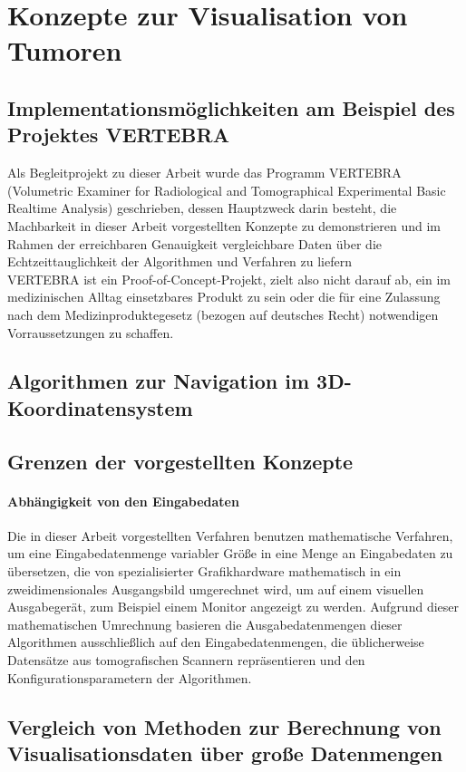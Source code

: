 \documentclass[a4paper]{scrartcl}
\begin{document}
\section{Konzepte zur Visualisation von Tumoren}\label{ssec:concepts}
\subsection{Implementationsmöglichkeiten am Beispiel des Projektes VERTEBRA}\label{ssec:implementations}
Als Begleitprojekt zu dieser Arbeit wurde das Programm VERTEBRA
(Volumetric Examiner for Radiological and Tomographical Experimental Basic Realtime Analysis) geschrieben, dessen Hauptzweck darin besteht, die Machbarkeit in dieser Arbeit vorgestellten Konzepte zu demonstrieren und im Rahmen der erreichbaren Genauigkeit vergleichbare Daten über die Echtzeittauglichkeit der Algorithmen und Verfahren zu liefern \\
VERTEBRA ist ein Proof-of-Concept-Projekt, zielt also nicht darauf ab, ein im medizinischen Alltag einsetzbares Produkt zu sein oder die für eine Zulassung nach dem Medizinproduktegesetz (bezogen auf deutsches Recht) notwendigen Vorraussetzungen zu schaffen.
\subsection{Algorithmen zur Navigation im 3D-Koordinatensystem}\label{ssec:3dnav}
\subsection{Grenzen der vorgestellten Konzepte}\label{ssec:limits}
\paragraph{Abhängigkeit von den Eingabedaten}
Die in dieser Arbeit vorgestellten Verfahren benutzen mathematische Verfahren, um eine Eingabedatenmenge variabler Größe in eine Menge an Eingabedaten zu übersetzen, die von spezialisierter Grafikhardware mathematisch in ein zweidimensionales Ausgangsbild umgerechnet wird, um auf einem visuellen Ausgabegerät, zum Beispiel einem Monitor angezeigt zu werden. Aufgrund dieser mathematischen Umrechnung basieren die Ausgabedatenmengen dieser Algorithmen ausschließlich auf den Eingabedatenmengen, die üblicherweise Datensätze aus tomografischen Scannern repräsentieren und den Konfigurationsparametern der Algorithmen.
\subsection{Vergleich von Methoden zur Berechnung von Visualisationsdaten über große Datenmengen}
\end{document}

